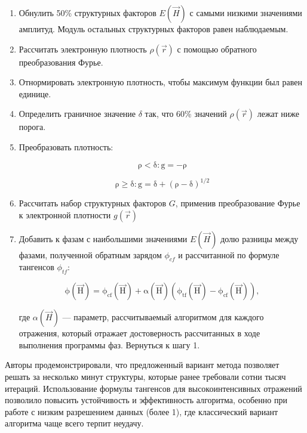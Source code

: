 \begin{enumerate}
	\item Обнулить 50\% структурных факторов $E(\overrightarrow{H})$ с самыми низкими значениями амплитуд. Модуль остальных структурных факторов равен наблюдаемым.
	\item Рассчитать электронную плотность $\rho(\overrightarrow{r})$ с помощью обратного преобразования Фурье.
	\item Отнормировать электронную плотность, чтобы максимум функции был равен единице.
	\item Определить граничное значение $\delta$ так, что 60\% значений $\rho(\overrightarrow{r})$ лежат ниже порога.
	\item Преобразовать плотность:
	
	\begin{equation}
		\mathrm{\rho<\delta: g = -\rho}
	\end{equation}
	 
	\begin{equation}
		\mathrm{\rho\geq\delta: g = \delta + (\rho-\delta)^{1/2}}
	\end{equation}

	\item Рассчитать набор структурных факторов $G$, применив преобразование Фурье к электронной плотности $g(\overrightarrow{r})$
	\item Добавить к фазам с наибольшими значениями $E(\overrightarrow{H})$ долю разницы между фазами, полученной обратным зарядом $\phi_{cf}$ и рассчитанной по формуле тангенсов $\phi_{tf}$:
	
	\begin{equation}
		\mathrm{\phi(\overrightarrow{H}) = \phi_{cf}(\overrightarrow{H})+\alpha(\overrightarrow{H})(\phi_{tf}(\overrightarrow{H})-\phi_{cf}(\overrightarrow{H})),}
	\end{equation}
	 
	 где $\alpha(\overrightarrow{H})$ --- параметр, рассчитываемый алгоритмом для каждого отражения, который отражает достоверность рассчитанных в ходе выполнения программы фаз. Вернуться к шагу 1.
\end{enumerate}

Авторы продемонстрировали, что предложенный вариант метода позволяет решать за несколько минут структуры, которые ранее требовали сотни тысяч итераций. Использование формулы тангенсов для высокоинтенсивных отражений позволило повысить устойчивость и эффективность алгоритма, особенно при работе с низким разрешением данных (более 1\angstrom), где классический вариант алгоритма чаще всего терпит неудачу.


